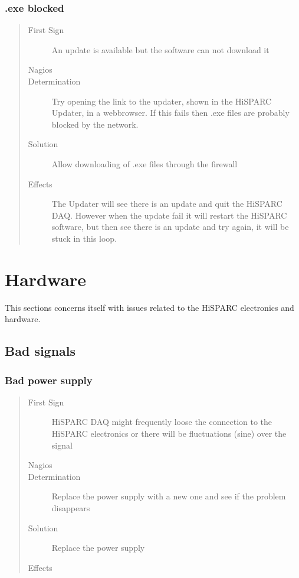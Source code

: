 \documentclass[a4paper,11pt,english]{sphinxmanual}
\begin{document}
\subsubsection{.exe blocked}
\label{known-issues:exe-blocked}\begin{quote}\begin{description}
\item[{First Sign}] \leavevmode
An update is available but the software can not download it

\item[{Nagios}] \leavevmode
\item[{Determination}] \leavevmode
Try opening the link to the updater, shown in the HiSPARC Updater, in a webbrowser. If this fails then .exe files are probably blocked by the network.

\item[{Solution}] \leavevmode
Allow downloading of .exe files through the firewall

\item[{Effects}] \leavevmode
The Updater will see there is an update and quit the HiSPARC DAQ. However when the update fail it will restart the HiSPARC software, but then see there is an update and try again, it will be stuck in this loop.

\end{description}\end{quote}


\section{Hardware}
\label{known-issues:hardware}
This sections concerns itself with issues related to the HiSPARC
electronics and hardware.


\subsection{Bad signals}
\label{known-issues:bad-signals}

\subsubsection{Bad power supply}
\label{known-issues:bad-power-supply}\begin{quote}\begin{description}
\item[{First Sign}] \leavevmode
HiSPARC DAQ might frequently loose the connection to the HiSPARC electronics or there will be fluctuations (sine) over the signal

\item[{Nagios}] \leavevmode
\item[{Determination}] \leavevmode
Replace the power supply with a new one and see if the problem disappears

\item[{Solution}] \leavevmode
Replace the power supply

\item[{Effects}] \leavevmode
\end{description}\end{quote}
\end{document}
